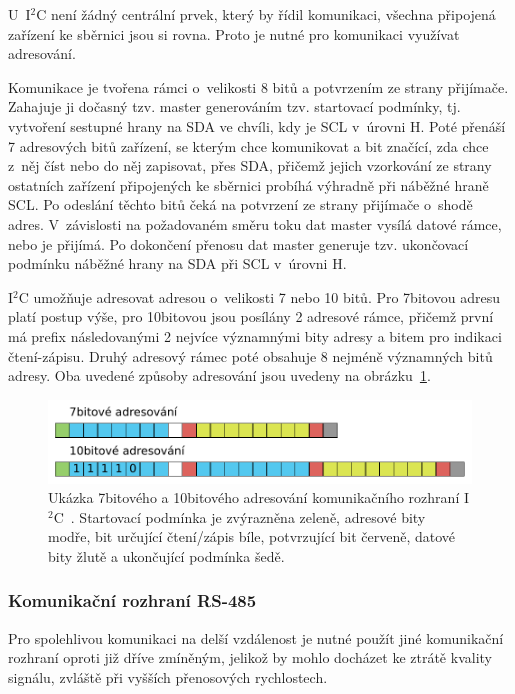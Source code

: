                 U~I$^2$C není žádný centrální prvek, který by řídil komunikaci, všechna připojená zařízení ke sběrnici jsou si rovna. Proto je nutné pro komunikaci využívat adresování. 

                Komunikace je tvořena rámci o~velikosti 8 bitů a potvrzením ze strany přijímače. Zahajuje ji dočasný tzv. master generováním tzv. startovací podmínky, tj. vytvoření sestupné hrany na SDA ve chvíli, kdy je SCL v~úrovni H. Poté přenáší 7 adresových bitů zařízení, se kterým chce komunikovat a bit značící, zda chce z~něj číst nebo do něj zapisovat, přes SDA, přičemž jejich vzorkování ze strany ostatních zařízení připojených ke sběrnici probíhá výhradně při náběžné hraně SCL. Po odeslání těchto bitů čeká na potvrzení ze strany přijímače o~shodě adres. V~závislosti na požadovaném směru toku dat master vysílá datové rámce, nebo je přijímá. Po dokončení přenosu dat master generuje tzv. ukončovací podmínku náběžné hrany na SDA při SCL v~úrovni H.~\cite{book:embedded_1}

                I$^2$C umožňuje adresovat adresou o~velikosti 7 nebo 10 bitů. Pro 7bitovou adresu platí postup výše, pro 10bitovou jsou posílány 2 adresové rámce, přičemž první má prefix  následovanými 2 nejvíce významnými bity adresy a bitem pro indikaci čtení-zápisu. Druhý adresový rámec poté obsahuje 8 nejméně významných bitů adresy. Oba uvedené způsoby adresování jsou uvedeny na obrázku~\ref{img:iic}.

                \begin{figure}[h]
                    \centering
                    \includegraphics[width=\linewidth]{obrazky-figures/i2c.pdf}
                    \caption{Ukázka 7bitového a 10bitového adresování komunikačního rozhraní I$^2$C~\cite{book:embedded_2}. Startovací podmínka je zvýrazněna zeleně, adresové bity modře, bit určující čtení/zápis bíle, potvrzující bit červeně, datové bity žlutě a ukončující podmínka šedě.}
                    \label{img:iic}
                \end{figure}

            \subsubsection{Komunikační rozhraní RS-485}
                Pro spolehlivou komunikaci na delší vzdálenost je nutné použít jiné komunikační rozhraní oproti již dříve zmíněným, jelikož by mohlo docházet ke ztrátě kvality signálu, zvláště při vyšších přenosových rychlostech.


